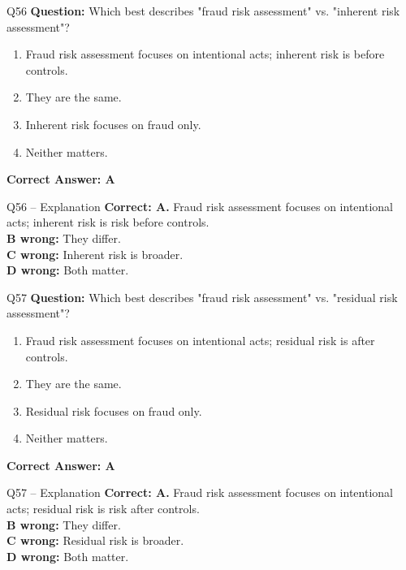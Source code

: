 \documentclass[aspectratio=169,10pt]{beamer}
\begin{document}
	\begin{frame}[t]{Q56}
		\small
		\textbf{Question:} Which best describes "fraud risk assessment" vs. "inherent risk assessment"?
		\begin{enumerate}[label=\Alph*.,itemsep=1pt,topsep=2pt]
			\item Fraud risk assessment focuses on intentional acts; inherent risk is before controls.
			\item They are the same.
			\item Inherent risk focuses on fraud only.
			\item Neither matters.
		\end{enumerate}
		\vspace{4pt}
		\textbf{Correct Answer: A}
	\end{frame}
	
	\begin{frame}[t]{Q56 -- Explanation}
		\small
		\textbf{Correct: A.} Fraud risk assessment focuses on intentional acts; inherent risk is risk before controls. \\[4pt]
		\textbf{B wrong:} They differ. \\[2pt]
		\textbf{C wrong:} Inherent risk is broader. \\[2pt]
		\textbf{D wrong:} Both matter.
	\end{frame}
	
	\begin{frame}[t]{Q57}
		\small
		\textbf{Question:} Which best describes "fraud risk assessment" vs. "residual risk assessment"?
		\begin{enumerate}[label=\Alph*.,itemsep=1pt,topsep=2pt]
			\item Fraud risk assessment focuses on intentional acts; residual risk is after controls.
			\item They are the same.
			\item Residual risk focuses on fraud only.
			\item Neither matters.
		\end{enumerate}
		\vspace{4pt}
		\textbf{Correct Answer: A}
	\end{frame}
	
	\begin{frame}[t]{Q57 -- Explanation}
		\small
		\textbf{Correct: A.} Fraud risk assessment focuses on intentional acts; residual risk is risk after controls. \\[4pt]
		\textbf{B wrong:} They differ. \\[2pt]
		\textbf{C wrong:} Residual risk is broader. \\[2pt]
		\textbf{D wrong:} Both matter.
	\end{frame}
	
\end{document}
